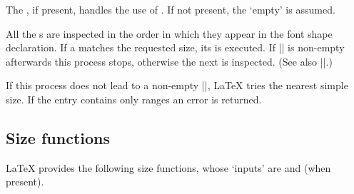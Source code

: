 \documentclass{ltxguide}[1995/11/28]
\begin{document}
The , if present, handles the use of .  If
not present, the `empty'  is assumed.

All the s are inspected in the order in which they appear
in the font shape declaration. If a  matches the requested
size, its  is executed. If |\external@font| is
non-empty afterwards this process stops, otherwise the next
 is inspected. (See also |\DeclareSizeFunction|.)

If this process does not lead to a non-empty |\external@font|, \LaTeX{}
tries the nearest simple size. If the entry contains only ranges an
error is returned.

\subsection{Size functions}
\label{sec:sizefunct}

\LaTeX{} provides the following size functions, whose `inputs' are
 and  (when present).
\end{document}
